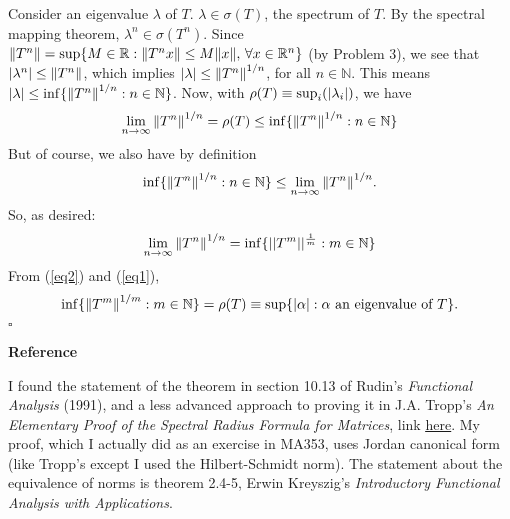 \documentclass[11pt]{article}
\begin{document}
Consider an eigenvalue $\lambda$ of $T$. $\lambda \in \sigma(T)$, the spectrum of $T$. By the spectral mapping theorem, $\lambda^n \in \sigma(T^n)$. Since $\norm{T^n} = \sup \{ M \in \mathbb{R} : \norm{T^nx} \leq M\norm{x},\,\forall x\in \mathbb{R}^n \}$ (by Problem 3), we see that $\abs{\lambda^n} \leq \norm{T^n}$, which implies $\abs{\lambda} \leq \norm{T^n}^{1/n}$, for all $n\in \mathbb{N}$. This means $\abs{\lambda} \leq \inf \{ \norm{T^n}^{1/n} : n\in \mathbb{N} \}$. Now, with $\rho(T) \equiv \sup_i(\abs{\lambda_i})$, we have 
\begin{align*}
\lim\limits_{n\to \infty}\norm{T^n}^{1/n} =  \rho(T) \leq \inf \{ \norm{T^n}^{1/n} : n\in \mathbb{N} \}
\end{align*}
But of course, we also have by definition
\begin{align*}
\inf \{ \norm{T^n}^{1/n} : n\in \mathbb{N} \} \leq \lim\limits_{n\to \infty}\norm{T^n}^{1/n}.
\end{align*}
So, as desired:
\begin{align}\label{eq1}
\lim\limits_{n\to \infty}\norm{T^n}^{1/n} = \inf \{  || T^m || ^\frac{1}{m} : m \in \mathbb{N} \}
\end{align}
From (\ref{eq2}) and (\ref{eq1}), 
\begin{align*}
\inf \{ \norm{T^m}^{1/m} : m \in \mathbb{N}  \} = \rho(T) \equiv \sup\{ \abs{\alpha} : \alpha \text{ an eigenvalue of } T  \}.
\end{align*}
\hfill $\square$




\noindent \textbf{Reference}

I found the statement of the theorem in section 10.13 of Rudin's \textit{Functional Analysis} (1991), and a less advanced approach to proving it in J.A. Tropp's \textit{An Elementary Proof of the Spectral Radius Formula for Matrices}, link \href{https://pdfs.semanticscholar.org/0bb8/67b2a2cc8e2711bc3273e21db5acdbc06e4d.pdf}{\underline{here}}.  My proof, which I actually did as an exercise in MA353, uses Jordan canonical form (like Tropp's except I used the Hilbert-Schmidt norm). The statement about the equivalence of norms is theorem 2.4-5, Erwin Kreyszig's \textit{Introductory Functional Analysis with Applications}. 
\end{document}
